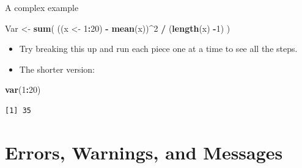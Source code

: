 \documentclass[
  11pt,
  ignorenonframetext,
]{beamer}
\newenvironment{Shaded}{\begin{snugshade}}{\end{snugshade}}
\newcommand{\DecValTok}[1]{\textcolor[rgb]{0.00,0.00,0.81}{#1}}
\newcommand{\FunctionTok}[1]{\textcolor[rgb]{0.13,0.29,0.53}{\textbf{#1}}}
\newcommand{\NormalTok}[1]{#1}
\newcommand{\OtherTok}[1]{\textcolor[rgb]{0.56,0.35,0.01}{#1}}
\newcommand{\SpecialCharTok}[1]{\textcolor[rgb]{0.81,0.36,0.00}{\textbf{#1}}}
\providecommand{\tightlist}{%
  \setlength{\itemsep}{0pt}\setlength{\parskip}{0pt}}
\begin{document}
\begin{frame}[fragile]{A complex example}
\protect\hypertarget{a-complex-example}{}
\begin{Shaded}
\begin{Highlighting}[]
\NormalTok{Var }\OtherTok{\textless{}{-}} \FunctionTok{sum}\NormalTok{( ((x }\OtherTok{\textless{}{-}} \DecValTok{1}\SpecialCharTok{:}\DecValTok{20}\NormalTok{) }\SpecialCharTok{{-}} \FunctionTok{mean}\NormalTok{(x))}\SpecialCharTok{\^{}}\DecValTok{2} \SpecialCharTok{/}\NormalTok{ (}\FunctionTok{length}\NormalTok{(x) }\SpecialCharTok{{-}}\DecValTok{1}\NormalTok{) )}
\end{Highlighting}
\end{Shaded}

\begin{itemize}
\tightlist
\item
  Try breaking this up and run each piece one at a time to see all the
  steps.
\end{itemize}

\pause

\begin{itemize}
\tightlist
\item
  The shorter version:
\end{itemize}

\begin{Shaded}
\begin{Highlighting}[]
\FunctionTok{var}\NormalTok{(}\DecValTok{1}\SpecialCharTok{:}\DecValTok{20}\NormalTok{)}
\end{Highlighting}
\end{Shaded}

\begin{verbatim}
[1] 35
\end{verbatim}
\end{frame}

\hypertarget{errors-warnings-and-messages}{%
\section{Errors, Warnings, and
Messages}\label{errors-warnings-and-messages}}
\end{document}
